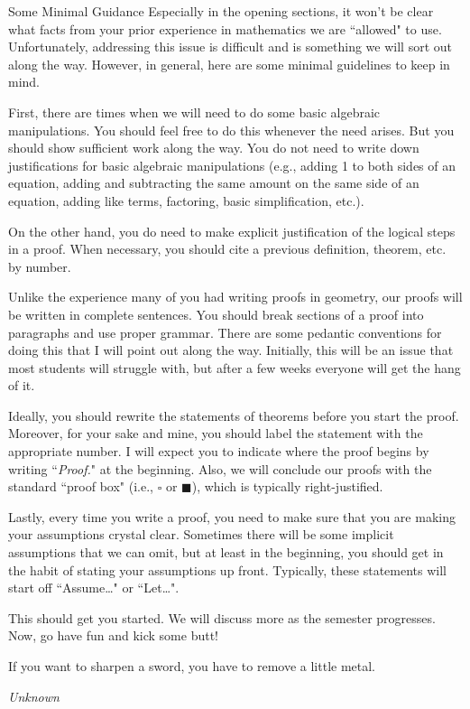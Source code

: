 \begin{section}{Some Minimal Guidance}
Especially in the opening sections, it won't be clear what facts from your prior experience in mathematics we are ``allowed" to use.  Unfortunately, addressing this issue is difficult and is something we will sort out along the way.  However, in general, here are some minimal guidelines to keep in mind.  

First, there are times when we will need to do some basic algebraic manipulations.  You should feel free to do this whenever the need arises.  But you should show sufficient work along the way.  You do not need to write down justifications for basic algebraic manipulations (e.g., adding 1 to both sides of an equation, adding and subtracting the same amount on the same side of an equation, adding like terms, factoring, basic simplification, etc.).  

On the other hand, you do need to make explicit justification of the logical steps in a proof.  When necessary, you should cite a previous definition, theorem, etc. by number.

Unlike the experience many of you had writing proofs in geometry, our proofs will be written in complete sentences.  You should break sections of a proof into paragraphs and use proper grammar.  There are some pedantic conventions for doing this that I will point out along the way.  Initially, this will be an issue that most students will struggle with, but after a few weeks everyone will get the hang of it.

Ideally, you should rewrite the statements of theorems before you start the proof.  Moreover, for your sake and mine, you should label the statement with the appropriate number.  I will expect you to indicate where the proof begins by writing ``\emph{Proof.}" at the beginning.  Also, we will conclude our proofs with the standard ``proof box" (i.e., $\square$ or $\blacksquare$), which is typically right-justified.

Lastly, every time you write a proof, you need to make sure that you are making your assumptions crystal clear.  Sometimes there will be some implicit assumptions that we can omit, but at least in the beginning, you should get in the habit of stating your assumptions up front.  Typically, these statements will start off ``Assume\ldots" or ``Let\ldots".  

This should get you started.  We will discuss more as the semester progresses.  Now, go have fun and kick some butt!

\epigraph{If you want to sharpen a sword, you have to remove a little metal.}{\emph{Unknown}}

\end{section}